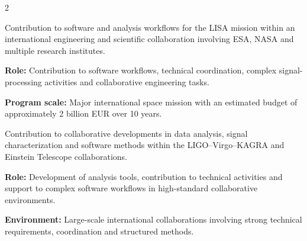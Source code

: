 \documentclass[8pt,a4paper,ragged2e,withhyper]{../_shared/altacv}
\begin{document}
\begin{paracol}{2}







\end{paracol}

\newpage
{}


Contribution to software and analysis workflows for the LISA mission within an international engineering and scientific collaboration involving ESA, NASA and multiple research institutes.

\textbf{Role:} Contribution to software workflows, technical coordination, complex signal-processing activities and collaborative engineering tasks.

\textbf{Program scale:} Major international space mission with an estimated budget of approximately 2 billion EUR over 10 years.

\divider


Contribution to collaborative developments in data analysis, signal characterization and software methods within the LIGO--Virgo--KAGRA and Einstein Telescope collaborations.

\textbf{Role:} Development of analysis tools, contribution to technical activities and support to complex software workflows in high-standard collaborative environments.

\textbf{Environment:} Large-scale international collaborations involving strong technical requirements, coordination and structured methods.
\end{document}
